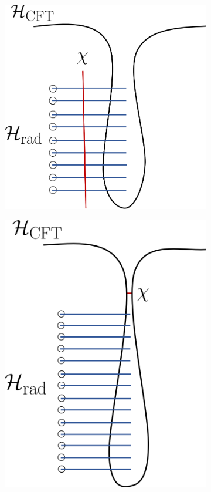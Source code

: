 \documentclass[11pt,a4paper]{article}
\begin{document}
\begin{figure}[t]
\vspace{2cm}
\begin{subfigure}{.48\textwidth}
  \centering
  \vspace{-2cm}
 \includegraphics[width = 0.8\linewidth]{Evaporation_BeforePage.png}
\end{subfigure}
\begin{subfigure}{.48\textwidth}
  \centering
  \vspace{-2cm}
 \includegraphics[width = 0.7\linewidth]{Evaporation_AfterPage.png}

\end{subfigure}
\end{figure}
\end{document}
